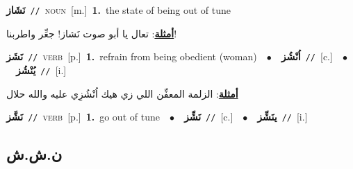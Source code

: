 \documentclass[10pt,a4paper,twoside]{article} %
\begin{document}
\begin{multicols}{2}
{\setlength\topsep{0pt}\textbf{\foreignlanguage{arabic}{نَشَاز}}\ {\color{gray}\texttt{//}\color{black}}\ \textsc{noun}\ [m.]\ \textbf{1.}~the state of being out of tune\  \begin{flushright}\color{gray}\foreignlanguage{arabic}{\textbf{\underline{\foreignlanguage{arabic}{أمثلة}}}: تعال يا أبو صوت نَشاز! جعِّر واطربنا!}\end{flushright}\color{black}} \vspace{2mm}

{\setlength\topsep{0pt}\textbf{\foreignlanguage{arabic}{نَشَز}}\ {\color{gray}\texttt{//}\color{black}}\ \textsc{verb}\ [p.]\ \textbf{1.}~refrain from being obedient (woman)\ \ $\bullet$\ \ \setlength\topsep{0pt}\textbf{\foreignlanguage{arabic}{اُنْشُز}}\ {\color{gray}\texttt{//}\color{black}}\ [c.]\ \ $\bullet$\ \ \setlength\topsep{0pt}\textbf{\foreignlanguage{arabic}{يُنْشُز}}\ {\color{gray}\texttt{//}\color{black}}\ [i.]\  \begin{flushright}\color{gray}\foreignlanguage{arabic}{\textbf{\underline{\foreignlanguage{arabic}{أمثلة}}}: الزلمة المعفِّن اللي زي هيك اُنْشُزِي عليه والله حلال}\end{flushright}\color{black}} \vspace{2mm}

{\setlength\topsep{0pt}\textbf{\foreignlanguage{arabic}{نَشَّز}}\ {\color{gray}\texttt{//}\color{black}}\ \textsc{verb}\ [p.]\ \textbf{1.}~go out of tune\ \ $\bullet$\ \ \setlength\topsep{0pt}\textbf{\foreignlanguage{arabic}{نَشِّز}}\ {\color{gray}\texttt{//}\color{black}}\ [c.]\ \ $\bullet$\ \ \setlength\topsep{0pt}\textbf{\foreignlanguage{arabic}{ينَشِّز}}\ {\color{gray}\texttt{//}\color{black}}\ [i.]\ } \vspace{2mm}

\vspace{-3mm}
\subsection*{\color{blue}\foreignlanguage{arabic}{ن.ش.ش}\color{blue}{}} 


\end{multicols}
\end{document}
